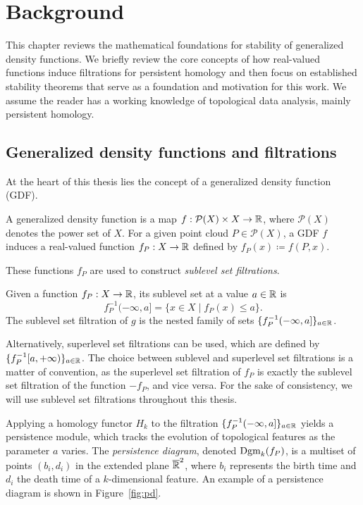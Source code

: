 \chapter{Background}
\label{chap:background}

This chapter reviews the mathematical foundations for stability of generalized
density functions. We briefly review the core concepts of how real-valued
functions induce filtrations for persistent homology and then focus on
established stability theorems that serve as a foundation and motivation for
this work. We assume the reader has a working knowledge of topological data
analysis, mainly persistent homology.

\section{Generalized density functions and filtrations}

At the heart of this thesis lies the concept of a generalized density function (GDF).
\begin{definition}
    A generalized density function is a map $f : \mathcal{P}(X) \times X \to \mathbb{R}$,
    where $\mathcal{P}(X)$ denotes the power set of $X$. For a given point cloud
    $P \in \mathcal{P}(X)$, a GDF $f$ induces a real-valued function $f_P : X
    \to \mathbb{R}$ defined by $f_P(x) \coloneqq f(P, x)$.
\end{definition}

These functions $f_P$ are used to construct \emph{sublevel set filtrations}.
\begin{definition}
    Given a function $f_P : X \to \mathbb{R}$, its sublevel set at a value $a \in \mathbb{R}$ is
    \begin{equation}
        f_P^{-1}(-\infty, a] = \{ x \in X \mid f_P(x) \leq a \}.
    \end{equation}
    The sublevel set filtration of $g$ is the nested family of sets
    $\{f_P^{-1}(-\infty, a]\}_{a \in \mathbb{R}}$.
\end{definition}
Alternatively, superlevel set filtrations can be used, which are defined by
$\{f_P^{-1}[a, +\infty)\}_{a \in \mathbb{R}}$. The choice between sublevel and superlevel
set filtrations is a matter of convention, as the superlevel set filtration of
$f_P$ is exactly the sublevel set filtration of the function $-f_P$, and vice
versa. For the sake of consistency, we will use sublevel set filtrations
throughout this thesis.

Applying a homology functor $H_k$ to the filtration $\{f_P^{-1}(-\infty, a]\}_{a \in \mathbb{R}}$
yields a persistence module, which tracks the evolution of topological features
as the parameter $a$ varies. The \emph{persistence diagram}, denoted $\operatorname{Dgm}_k(f_P)$,
is a multiset of points $(b_i, d_i)$ in the extended plane $\overline{\mathbb{R}}^2$,
where $b_i$ represents the birth time and $d_i$ the death time of a
$k$-dimensional feature. An example of a persistence diagram is shown in
Figure~\ref{fig:pd}.

